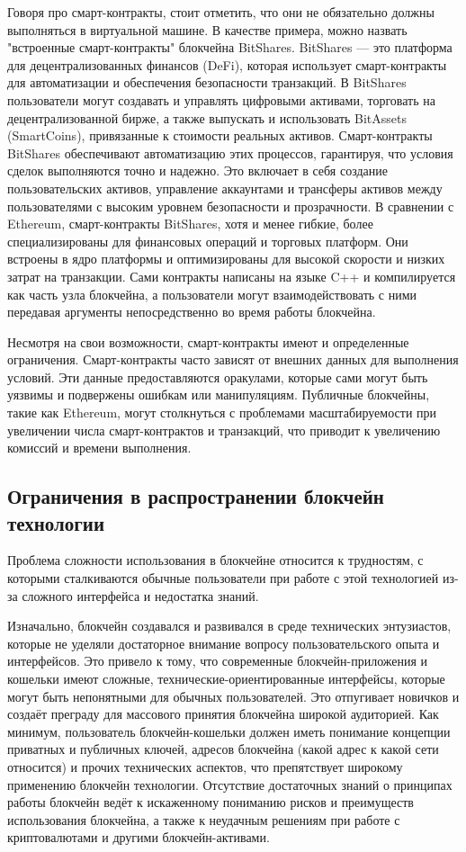 Говоря про смарт-контракты, стоит отметить, что они не обязательно должны выполняться в виртуальной машине. В качестве примера, можно назвать "встроенные смарт-контракты" блокчейна BitShares\cite{label20}. BitShares — это платформа для децентрализованных финансов (DeFi), которая использует смарт-контракты для автоматизации и обеспечения безопасности транзакций. В BitShares пользователи могут создавать и управлять цифровыми активами, торговать на децентрализованной бирже, а также выпускать и использовать BitAssets (SmartCoins), привязанные к стоимости реальных активов. Смарт-контракты BitShares обеспечивают автоматизацию этих процессов, гарантируя, что условия сделок выполняются точно и надежно. Это включает в себя создание пользовательских активов, управление аккаунтами и трансферы активов между пользователями с высоким уровнем безопасности и прозрачности. В сравнении с Ethereum, смарт-контракты BitShares, хотя и менее гибкие, более специализированы для финансовых операций и торговых платформ. Они встроены в ядро платформы и оптимизированы для высокой скорости и низких затрат на транзакции. Сами контракты написаны на языке C++ и компилируется как часть узла блокчейна, а пользователи могут взаимодействовать с ними передавая аргументы непосредственно во время работы блокчейна.

Несмотря на свои возможности, смарт-контракты имеют и определенные ограничения. Смарт-контракты часто зависят от внешних данных для выполнения условий. Эти данные предоставляются оракулами, которые сами могут быть уязвимы и подвержены ошибкам или манипуляциям. Публичные блокчейны, такие как Ethereum, могут столкнуться с проблемами масштабируемости при увеличении числа смарт-контрактов и транзакций, что приводит к увеличению комиссий и времени выполнения.

\subsection{Ограничения в распространении блокчейн технологии}

Проблема сложности использования в блокчейне относится к трудностям, с которыми сталкиваются обычные пользователи при работе с этой технологией из-за сложного интерфейса и недостатка знаний.

Изначально, блокчейн создавался и развивался в среде технических энтузиастов, которые не уделяли достаторное внимание вопросу пользовательского опыта и интерфейсов. Это привело к тому, что современные блокчейн-приложения и кошельки имеют сложные, технические-ориентированные интерфейсы, которые могут быть непонятными для обычных пользователей. Это отпугивает новичков и создаёт преграду для массового принятия блокчейна широкой аудиторией. Как минимум, пользователь блокчейн-кошельки должен иметь понимание концепции приватных и публичных ключей, адресов блокчейна (какой адрес к какой сети относится) и прочих технических аспектов, что препятствует широкому применению блокчейн технологии. Отсутствие достаточных знаний о принципах работы блокчейн ведёт к искаженному пониманию рисков и преимуществ использования блокчейна, а также к неудачным решениям при работе с криптовалютами и другими блокчейн-активами.

